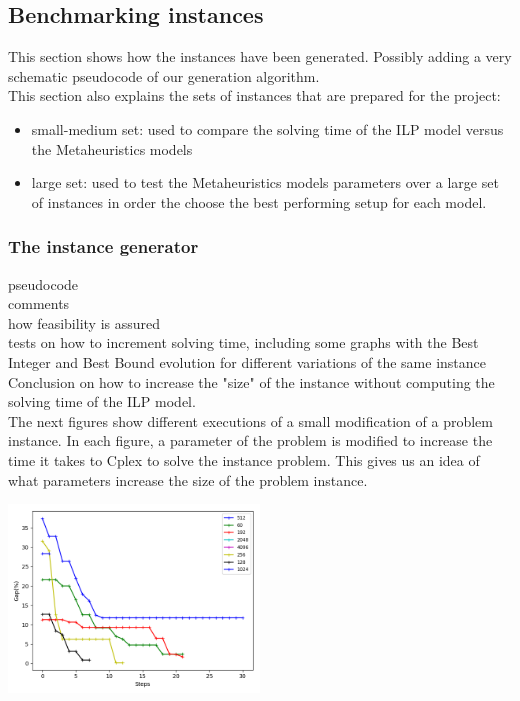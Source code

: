 \subsection{Benchmarking instances}

This section shows how the instances have been generated. Possibly adding a very schematic pseudocode of our generation algorithm.\\

This section also explains the sets of instances that are prepared for the project:\\
\begin{itemize}
	\item small-medium set: used to compare the solving time of the ILP model versus the Metaheuristics models
	\item large set: used to test the Metaheuristics models parameters over a large set of instances in order the choose the best performing setup for each model.
\end{itemize} 

\subsubsection{The instance generator}

pseudocode\\
comments\\
how feasibility is assured\\
tests on how to increment solving time, including some graphs with the Best Integer and Best Bound evolution for different variations of the same instance\\
Conclusion on how to increase the "size" of the instance without computing the solving time of the ILP model.\\

The next figures show different executions of a small modification of a problem instance. In each figure, a parameter of the problem is modified to increase the time it takes to Cplex to solve the instance problem. This gives us an idea of what parameters increase the size of the problem instance.\\

\begin{center}
\includegraphics[width=0.5\textwidth]{./img/instances_nurses_ilp_evol.png}
\end{center}

